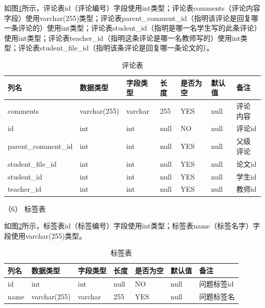 如图\ref{db-comment}所示，评论表id（评论编号）字段使用int类型；评论表comments（评论内容字段）使用varchar(255)类型；评论表parent\_comment\_id（指明该评论是回复哪一条评论的）使用int类型；评论表student\_id（指明是哪一名学生写的此条评论）使用int类型；评论表teacher\_id（指明这条评论是哪一名教师写的）使用int类型；评论表student\_file\_id（指明该条评论是回复哪一条论文的）。
\begin{table}[htbp]
    \centering
    \song\wuhao
    \caption{评论表}
    \label{db-comment}
    \begin{tabular}{lllllll}
        \hline
        列名                & 数据类型     & 字段类型 & 长度 & 是否为空 & 默认值 & 备注     \\ \hline
        comments            & varchar(255) & varchar  & 255  & YES      & null   & 评论内容 \\
        id                  & int          & int      & null & NO       & null   & 评论id   \\
        parent\_comment\_id & int          & int      & null & YES      & null   & 父级评论 \\
        student\_file\_id   & int          & int      & null & YES      & null   & 论文id   \\
        student\_id         & int          & int      & null & YES      & null   & 学生id   \\
        teacher\_id         & int          & int      & null & YES      & null   & 教师id   \\ \hline
    \end{tabular}
\end{table}

（6）  标签表

如图\ref{db-tag}所示，标签表id（标签编号）字段使用int类型；标签表name（标签名字）字段使用varchar(255)类型。
\begin{table}[htbp]
    \centering
    \song\wuhao
    \caption{标签表}
    \label{db-tag}
    \begin{tabular}{lllllll}
        \hline
        列名 & 数据类型     & 字段类型 & 长度 & 是否为空 & 默认值 & 备注       \\ \hline
        id   & int          & int      & null & NO       & null   & 问题标签id \\
        name & varchar(255) & varchar  & 255  & YES      & null   & 问题标签名 \\ \hline
    \end{tabular}
\end{table}

